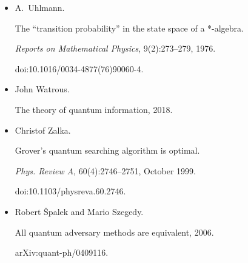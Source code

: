 \documentclass[10pt,a4paper]{article}
\begin{document}
\begin{itemize}
doi:10.1137/s0097539795293172.





\item[] 
[30]

A. Uhlmann.


The “transition probability” in the state space of a *-algebra.


\emph{Reports on Mathematical Physics}, 9(2):273–279, 1976.


doi:10.1016/0034-4877(76)90060-4.





\item[] 
[31]

John Watrous.


The theory of quantum information, 2018.





\item[] 
[32]

Christof Zalka.


Grover’s quantum searching algorithm is optimal.


\emph{Phys. Review A}, 60(4):2746–2751, October 1999.


doi:10.1103/physreva.60.2746.





\item[] 
[33]

Robert Špalek and Mario Szegedy.


All quantum adversary methods are equivalent, 2006.


arXiv:quant-ph/0409116.





\end{itemize}
\end{document}
